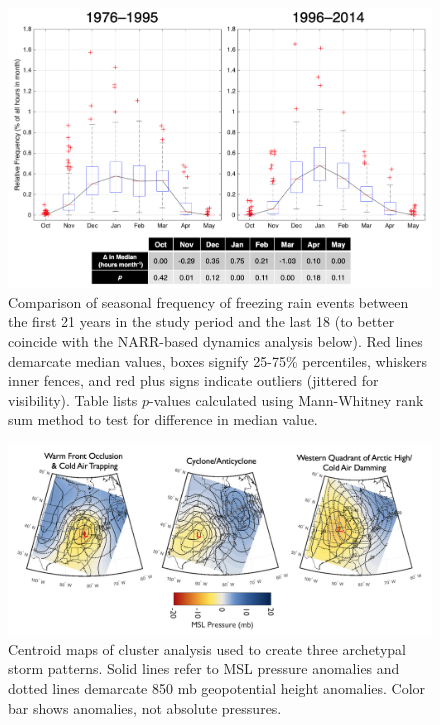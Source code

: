 \documentclass[twocol]{ametsoc}
\begin{document}
\begin{figure}
\centering
\includegraphics[width=1\textwidth]{Seasons_Boxplot.png}
\caption{\label{fig:seasonal} Comparison of seasonal frequency of freezing rain events between the first 21 years in the study period and the last 18 (to better coincide with the NARR-based dynamics analysis below). Red lines demarcate median values, boxes signify 25-75\% percentiles, whiskers inner fences, and red plus signs indicate outliers (jittered for visibility). Table lists $p$-values calculated using Mann-Whitney rank sum method to test for difference in median value.}
\end{figure}

\begin{figure}
\centering
\includegraphics[width=1\textwidth]{Cluster_Centroids.png}
\caption{\label{fig:centroids} Centroid maps of cluster analysis  used to create three archetypal storm patterns. Solid lines refer to MSL pressure anomalies and dotted lines demarcate 850 mb geopotential height anomalies. Color bar shows anomalies, not absolute pressures.}
\end{figure}
\end{document}
